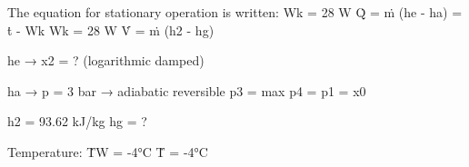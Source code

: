 The equation for stationary operation is written:  
Wk = 28 W  
Q̇ = ṁ (he - ha) = ṫ - Wk  
Wk = 28 W  
V̇ = ṁ (h2 - hg)  

he → x2 = ?  
(logarithmic damped)  

ha → p = 3 bar → adiabatic reversible  
p3 = max  
p4 = p1 = x0  

h2 = 93.62 kJ/kg  
hg = ?  

Temperature:  
ṪW = -4°C  
Ṫ = -4°C
